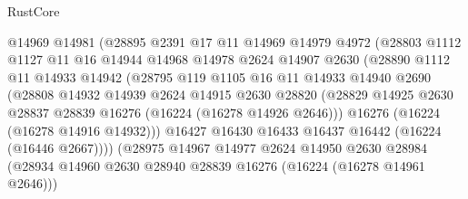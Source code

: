 \begin{lexlean}{RustCore}
\begin{coremodule}
                        @14969
                        @14981
                        (@28895
                          @2391
                          @17
                          @11
                          @14969
                          @14979
                          @4972
                          (@28803
                            @1112
                            @1127
                            @11
                            @16
                            @14944
                            @14968
                            @14978
                            @2624
                            @14907
                            @2630
                            (@28890
                              @1112
                              @11
                              @14933
                              @14942
                              (@28795
                                @119
                                @1105
                                @16
                                @11
                                @14933
                                @14940
                                @2690
                                (@28808
                                  @14932
                                  @14939
                                  @2624
                                  @14915
                                  @2630
                                  @28820
                                  (@28829
                                    @14925
                                    @2630
                                    @28837
                                    @28839
                                    @16276
                                    (@16224 (@16278 @14926 @2646)))
                                  @16276
                                  (@16224 (@16278 @14916 @14932)))
                                @16427
                                @16430
                                @16433
                                @16437
                                @16442
                                (@16224 (@16446 @2667))))
                            (@28975
                              @14967
                              @14977
                              @2624
                              @14950
                              @2630
                              @28984
                              (@28934
                                @14960
                                @2630
                                @28940
                                @28839
                                @16276
                                (@16224 (@16278 @14961 @2646)))

\end{coremodule}
\end{lexlean}

